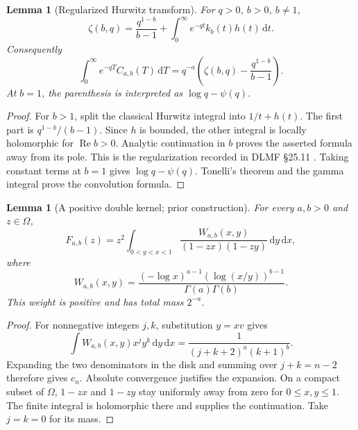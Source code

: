 \documentclass[11pt]{article}
\numberwithin{equation}{section}
\newtheorem{lemma}[theorem]{Lemma}
\theoremstyle{definition}
\theoremstyle{remark}
\DeclareMathOperator{\Repart}{Re}
\newcommand{\dd}{\,\mathrm d}
\newcommand{\cut}{\Omega}
\begin{document}
\begin{lemma}[Regularized Hurwitz transform]\label{lem:hurwitz}
For $q>0$, $b>0$, $b\ne1$,
\begin{equation}\label{eq:hurwitz}
 \zeta(b,q)=\frac{q^{1-b}}{b-1}
       +\int_0^\infty e^{-qt}k_b(t)h(t)\dd t.
\end{equation}
Consequently
\begin{equation}\label{eq:C-laplace}
 \int_0^\infty e^{-qT}C_{a,b}(T)\dd T
 =q^{-a}\left(\zeta(b,q)-\frac{q^{1-b}}{b-1}\right).
\end{equation}
At $b=1$, the parenthesis is interpreted as $\log q-\psi(q)$.
\end{lemma}
\begin{proof}
For $b>1$, split the classical Hurwitz integral into $1/t+h(t)$.
The first part is $q^{1-b}/(b-1)$. Since $h$ is bounded, the other
integral is locally holomorphic for $\Repart b>0$. Analytic continuation
in $b$ proves the asserted formula away from its pole. This is the
regularization recorded in DLMF \S25.11 \cite{dlmf-hurwitz}.
Taking constant terms at $b=1$ gives $\log q-\psi(q)$.
Tonelli's theorem and the gamma integral prove the convolution formula.
\end{proof}

\begin{lemma}[A positive double kernel; prior construction]\label{lem:double}
For every $a,b>0$ and $z\in\cut$,
\begin{equation}\label{eq:double}
 F_{a,b}(z)=z^2\int_{0<y<x<1}
 \frac{W_{a,b}(x,y)}{(1-zx)(1-zy)}\dd y\dd x,
\end{equation}
where
\begin{equation}\label{eq:doubleweight}
 W_{a,b}(x,y)=\frac{(-\log x)^{a-1}(\log(x/y))^{b-1}}
 {\Gamma(a)\Gamma(b)}.
\end{equation}
This weight is positive and has total mass $2^{-a}$.
\end{lemma}
\begin{proof}
For nonnegative integers $j,k$, substitution $y=xv$ gives
\[
 \int W_{a,b}(x,y)x^jy^k\dd y\dd x
 =\frac1{(j+k+2)^a(k+1)^b}.
\]
Expanding the two denominators in the disk and summing over $j+k=n-2$
therefore gives $c_n$. Absolute convergence justifies the expansion.
On a compact subset of $\cut$, $1-zx$ and $1-zy$ stay uniformly away
from zero for $0\le x,y\le1$. The finite integral is holomorphic there
and supplies the continuation. Take $j=k=0$ for its mass.
\end{proof}
\end{document}
